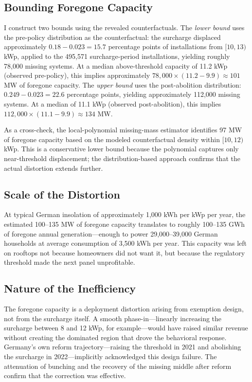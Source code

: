 \documentclass[12pt]{article}
\begin{document}
\subsection{Bounding Foregone Capacity}

I construct two bounds using the revealed counterfactuals. The \textit{lower bound} uses the pre-policy distribution as the counterfactual: the surcharge displaced approximately $0.18 - 0.023 = 15.7$ percentage points of installations from $[10, 13)$ kWp, applied to the 495,571 surcharge-period installations, yielding roughly 78,000 missing systems. At a median above-threshold capacity of 11.2 kWp (observed pre-policy), this implies approximately $78{,}000 \times (11.2 - 9.9) \approx 101$ MW of foregone capacity. The \textit{upper bound} uses the post-abolition distribution: $0.249 - 0.023 = 22.6$ percentage points, yielding approximately 112,000 missing systems. At a median of 11.1 kWp (observed post-abolition), this implies $112{,}000 \times (11.1 - 9.9) \approx 134$ MW.

As a cross-check, the local-polynomial missing-mass estimator identifies 97 MW of foregone capacity based on the modeled counterfactual density within $[10, 12)$ kWp. This is a conservative lower bound because the polynomial captures only near-threshold displacement; the distribution-based approach confirms that the actual distortion extends further.

\subsection{Scale of the Distortion}

At typical German insolation of approximately 1,000 kWh per kWp per year, the estimated 100--135 MW of foregone capacity translates to roughly 100--135 GWh of foregone annual generation---enough to power 29,000--39,000 German households at average consumption of 3,500 kWh per year. This capacity was left on rooftops not because homeowners did not want it, but because the regulatory threshold made the next panel unprofitable.

\subsection{Nature of the Inefficiency}

The foregone capacity is a deployment distortion arising from exemption design, not from the surcharge itself. A smooth phase-in---linearly increasing the surcharge between 8 and 12 kWp, for example---would have raised similar revenue without creating the dominated region that drove the behavioral response. Germany's own reform trajectory---raising the threshold in 2021 and abolishing the surcharge in 2022---implicitly acknowledged this design failure. The attenuation of bunching and the recovery of the missing middle after reform confirm that the correction was effective.
\end{document}
